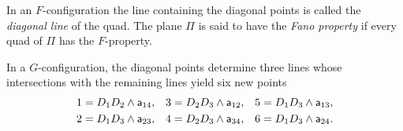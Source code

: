 \begin{defn}
    In an $F$-configuration the line containing the diagonal points is called the \textsl{diagonal line} of the quad. The plane $\Pi$ is said to have the \textsl{Fano property} if every quad of $\Pi$ has the $F$-property.
    
    In a\/ $G$-configuration, the diagonal points determine three lines whose intersections with the remaining lines yield six new points
    \begin{align*}
        1 &= D_1D_2\wedge\mathsf a_{14},
        &3 &= D_2D_3\wedge\mathsf a_{12},
        &5 &= D_1D_3\wedge\mathsf a_{13},\\
        2 &= D_1D_3\wedge\mathsf a_{23},
        &4 &= D_2D_3\wedge\mathsf a_{34},
        &6 &= D_1D_3\wedge\mathsf a_{24}.
    \end{align*}
\end{defn}


